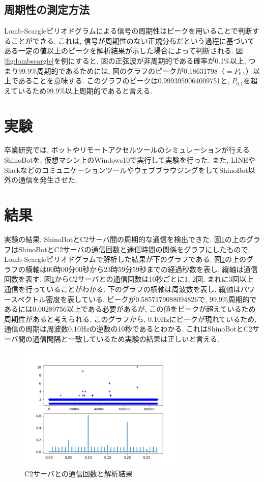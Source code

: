 \documentclass[twocolumn,10pt]{ltjsarticle}
\begin{document}
\subsection{周期性の測定方法}
Lomb-Scargleピリオドグラムによる信号の周期性はピークを用いることで判断することができる. 
これは, 信号が周期性のない正規分布だという過程に基づいてある一定の値以上のピークを解析結果が示した場合によって判断される. 
図\ref{fig:lombscargle}を例にすると, 図の正弦波が非周期的である確率が0.1\%以上, 
つまり99.9\%周期的であるためには, 図のグラフのピークが0.18631798（${=P_{0.1}}$）以上であることを意味する. 
このグラフのピークは0.9993959064009751と, ${P_{0.1}}$を超えているため99.9\%以上周期的であると言える. 

\section{実験}
卒業研究では, ボットやリモートアクセルツールのシミュレーションが行えるShinoBotを, 
仮想マシン上のWindows10で実行して実験を行った. 
また, LINEやSlackなどのコミュニケーションツールやウェブブラウジングをしてShinoBot以外の通信を発生させた. 

\section{結果}
実験の結果, ShinoBotとC2サーバ間の周期的な通信を検出できた. 
図\ref{fig:shinobot}の上のグラフはShinoBotとC2サーバの通信回数と通信時間の関係をグラフにしたもので, 
Lomb-Scargleピリオドグラムで解析した結果が下のグラフである. 
図\ref{fig:shinobot}の上のグラフの横軸は00時00分00秒から23時59分59秒までの経過秒数を表し, 
縦軸は通信回数を表す. 図\ref{fig:shinobot}からC2サーバとの通信回数は10秒ごとに1, 2回, 
まれに3回以上通信を行っていることがわかる. 
下のグラフの横軸は周波数を表し, 縦軸はパワースペクトル密度を表している. 
ピークが0.5857179088094826で, 99.9\%周期的であるには0.00289756以上である必要があるが, 
この値をピークが超えているため周期性があると考えられる. 
このグラフから, 0.10Hzにピークが現れているため, 通信の周期は周波数0.10Hzの逆数の10秒であるとわかる. 
これはShinoBotとC2サーバ間の通信間隔と一致しているため実験の結果は正しいと言える. 

\begin{figure}[htb]
    \centering
    \includegraphics[width=8cm]{images/【実験】LombScargleピリオドグラムによるShinoBot通信の解析/shinobot.png}
    \caption{C2サーバとの通信回数と解析結果}
    \label{fig:shinobot}
\end{figure}
\end{document}
